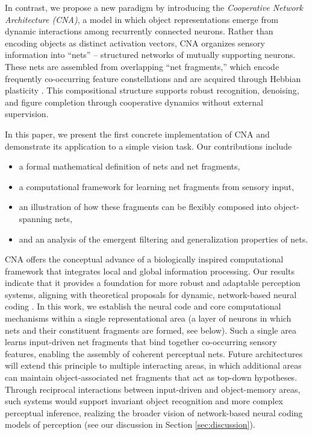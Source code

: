 \documentclass[12pt]{article}
\begin{document}
In contrast, we propose a new paradigm by introducing the \emph{Cooperative Network Architecture (CNA)}, a model in which object representations emerge from dynamic interactions among recurrently connected neurons. Rather than encoding objects as distinct activation vectors, CNA organizes sensory information into ``nets'' -- structured networks of mutually supporting neurons. These nets are assembled from overlapping ``net fragments,'' which encode frequently co-occurring feature constellations and are acquired through Hebbian plasticity \citep{hebb_organization_1949}. This compositional structure supports robust recognition, denoising, and figure completion through cooperative dynamics without external supervision.

In this paper, we present the first concrete implementation of CNA and demonstrate its application to a simple vision task. Our contributions include
\begin{itemize} \item a formal mathematical definition of nets and net fragments,
\item a computational framework for learning net fragments from sensory input,
\item an illustration of how these fragments can be flexibly composed into object-spanning nets,
\item and an analysis of the emergent filtering and generalization properties of nets.
\end{itemize}

CNA offers the conceptual advance of a biologically inspired computational framework that integrates local and global information processing. Our results indicate that it provides a foundation for more robust and adaptable perception systems, aligning with theoretical proposals for dynamic, network-based neural coding \citep{von_der_malsburg_concerning_2018, von_der_malsburg_theory_2022}.
In this work, we establish the neural code and core computational mechanisms within a single representational area (a layer of neurons in which nets and their constituent fragments are formed, see below).  
Such a single area learns input-driven net fragments that bind together co-occurring sensory features, enabling the assembly of coherent perceptual nets. 
Future architectures will extend this principle to multiple interacting areas, in which additional areas can maintain object-associated net fragments that act as top-down hypotheses. Through reciprocal interactions between input-driven and object-memory areas, such systems would support invariant object recognition and more complex perceptual inference, realizing the broader vision of network-based neural coding models of perception (see our discussion in Section \ref{sec:discussion}).
\end{document}

